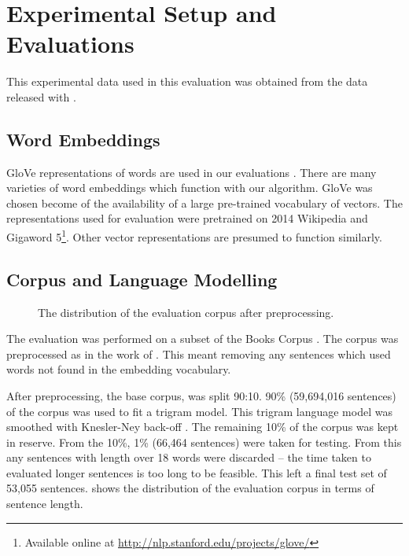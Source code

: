 \documentclass[11pt]{article}
\theoremstyle{plain}
\theoremstyle{definition}
\newcommand{\parencite}{\protect\cite}
\newcommand{\textcite}{\protect\newcite}
\begin{document}




\section{Experimental Setup and Evaluations} \label{evalsettings}
This experimental data used in this evaluation was
obtained from the data released with \textcite{White2015BOWgen}. 
\subsection{Word Embeddings}
GloVe representations of words are used in our evaluations \parencite{pennington2014glove}. There are many varieties of word embeddings which function with our algorithm. GloVe was chosen become of the availability of a large pre-trained vocabulary of vectors. The representations used for evaluation were pretrained on 2014 Wikipedia and Gigaword 5\footnote{Available online at \url{http://nlp.stanford.edu/projects/glove/}}.  Other vector representations are presumed to function similarly.

\subsection{Corpus and Language Modelling}
\begin{figure}
	\caption{\label{fig:corpus} The distribution of the evaluation corpus after preprocessing.}
\end{figure}

The evaluation was performed on a subset of the Books Corpus \parencite{moviebook}. The corpus was preprocessed as in the work of \textcite{White2015BOWgen}. This meant removing any sentences which used words not found in the embedding vocabulary.

After preprocessing, the base corpus, was split 90:10. 90\% (59,694,016 sentences) of the corpus was used to fit a trigram model. This trigram language model was smoothed with Knesler-Ney back-off \parencite{kneser1995improved}. The remaining 10\% of the corpus was kept in reserve. From the 10\%, 1\% (66,464 sentences) were taken for testing. From this any sentences with length over 18 words were discarded -- the time taken to evaluated longer sentences is too long to be feasible. This left a final test set of 53,055 sentences.  shows the distribution of the evaluation corpus in terms of sentence length.
 
\end{document}
